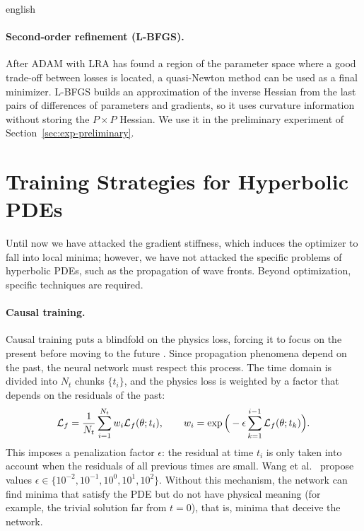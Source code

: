 \begin{hyphenrules}{english}
\paragraph{Second-order refinement (L-BFGS).}
After ADAM with LRA has found a region of the parameter space where a good trade-off between losses is
located, a quasi-Newton method can be used as a final minimizer. L-BFGS builds an approximation of the
inverse Hessian from the last pairs of differences of parameters and gradients, so it uses curvature
information without storing the $P\times P$ Hessian. We use it in the preliminary experiment of Section~\ref{sec:exp-preliminary}.

\section{Training Strategies for Hyperbolic PDEs}\label{sec:training-strategies}

Until now we have attacked the gradient stiffness, which induces the optimizer to fall into local minima;
however, we have not attacked the specific problems of hyperbolic PDEs, such as the propagation of wave
fronts. Beyond optimization, specific techniques are required.

\paragraph{Causal training.}
Causal training puts a blindfold on the physics loss, forcing it to focus on the present before moving
to the future \cite{wang2024causality}. Since propagation phenomena depend on the past, the neural
network must respect this process. The time domain is divided into $N_t$ chunks $\{t_i\}$, and the
physics loss is weighted by a factor that depends on the residuals of the past:
\begin{equation}
  \mathcal{L}_f=\frac{1}{N_t}\sum_{i=1}^{N_t}w_i\mathcal{L}_f(\theta;t_i),\qquad
  w_i=\exp\Big(-\epsilon\sum_{k=1}^{i-1}\mathcal{L}_f(\theta;t_k)\Big).
  \label{eq:causal}
\end{equation}
This imposes a penalization factor $\epsilon$: the residual at time $t_i$ is only taken into account when
the residuals of all previous times are small. Wang et al.~\cite{wang2024causality} propose values
$\epsilon\in\{10^{-2},10^{-1},10^{0},10^{1},10^{2}\}$. Without this mechanism, the network can find
minima that satisfy the PDE but do not have physical meaning (for example, the trivial solution far from
$t=0$), that is, minima that deceive the network.


\end{hyphenrules}
